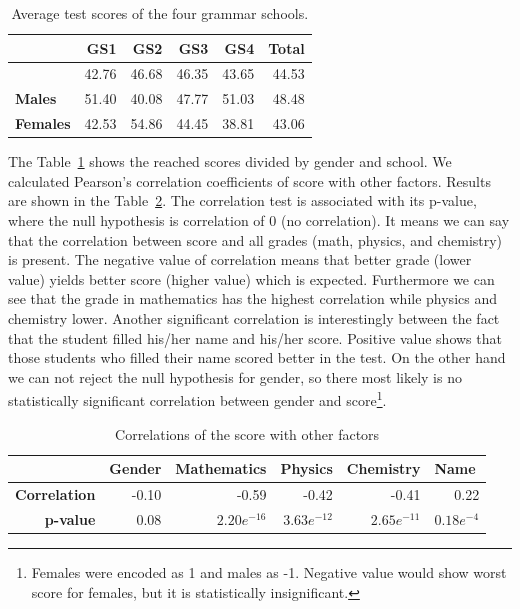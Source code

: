 \begin{table}[htbp]
  \centering
  \caption{Average test scores of the four grammar schools.}
	
	\vspace{3mm}
	
    \begin{tabular}{l|rrrr|r|}
		\hline
    &\textbf{GS1}   & \textbf{GS2} & \textbf{GS3} & \textbf{GS4} & \textbf{Total} \\
					\hline
    &42.76 & 46.68 & 46.35 & 43.65 & 44.53 \\
    \textbf{Males} & 51.40  & 40.08 & 47.77 & 51.03 & 48.48 \\
    \textbf{Females} & 42.53 & 54.86 & 44.45 & 38.81 & 43.06 \\
		\hline
    \end{tabular}%
  \label{tab:totals}%
\end{table}%

The Table~\ref{tab:totals} shows the reached scores divided by gender and school. We calculated Pearson's correlation coefficients of score with other factors. Results are shown in the Table~\ref{tab:corr1}. The correlation test is associated with its p-value, where the null hypothesis is correlation of 0 (no correlation). It means we can say that the correlation between score and all grades (math, physics, and chemistry) is present. The negative value of correlation means that better grade (lower value) yields better score (higher value) which is expected. Furthermore we can see that the grade in mathematics has the highest correlation while physics and chemistry lower. Another significant correlation is interestingly between the fact that the student filled his/her name and his/her score. Positive value shows that those students who filled their name scored better in the test.
On the other hand we can not reject the null hypothesis for gender, so there most likely is no statistically significant correlation between gender and score\footnote{Females were encoded as 1 and males as -1. Negative value would show worst score for females, but it is statistically insignificant.}.

\begin{table}[htbp]%
\caption{Correlations of the score with other factors}
\label{tab:corr1}
\begin{center}
    \begin{tabular}{rrrrrr}
    \hline
    \multicolumn{1}{l}{\textbf{}}  & \multicolumn{1}{l}{\textbf{Gender}} & \multicolumn{1}{l}{\textbf{Mathematics}} & \multicolumn{1}{l}{\textbf{Physics}} & \multicolumn{1}{l}{\textbf{Chemistry}}& \multicolumn{1}{l}{\textbf{Name}} \\
    \hline
    \textbf{Correlation}&  -0.10  & -0.59  & -0.42  & -0.41  & 0.22\\
		\textbf{p-value}&  0.08  & $2.20e^{-16}$  & $3.63e^{-12}$  & $2.65e^{-11}$ & $0.18e^{-4}$ \\
    \hline
    \end{tabular}%
\end{center}
\end{table}


